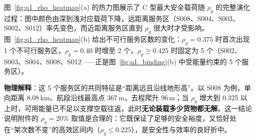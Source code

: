 图~\ref{fig:q1_rho_heatmap}(a) 的热力图展示了 C 型最大安全载荷随 $\rho_{g}$ 的完整演化过程：图中颜色由深到浅对应载荷下降，远距离服务区（S008、S004、S003、S002、S012）率先变色，而近距离服务区直到 $\rho_{g}$ 很大时才受影响。图~\ref{fig:q1_rho_heatmap}(b) 给出不可行服务区数的变化：$\rho_{g}=0.375$ 时首次出现 1 个不可行服务区，$\rho_{g}=0.40$ 时增至 2 个，$\rho_{g}\ge0.425$ 时固定为 5 个（S002、S003、S004、S008、S012——正是图~\ref{fig:q1_binding}(b) 中受能量约束的 5 个服务区）。

\textbf{物理解释}：这 5 个服务区的共同特征是“距离远且沿线地形高”。以 S008 为例，单向距离 8.08\,km、航段沿线最高点 367\,m，去程爬升 96\,m；当 $\rho_{g}$ 增大到 0.325 以上时，可用能量已不足以支撑空载往返，此时\textbf{无论装载多少货物都无解}。这一结论说明附件的 $\rho_{g}=20\%$ 取值是合理的：它既保证了足够的安全裕度，又恰好处在“架次数不变”的高效区间内（$\rho_{g}\le0.225$），是安全性与效率的良好折中。
